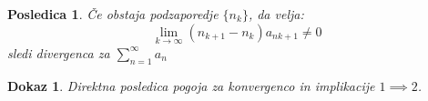 \documentclass{beamer}
\newtheorem{posledica}{Posledica}
\newtheorem{dokaz}{Dokaz}
\begin{document}
\begin{frame}
    \begin{posledica}
        Če obstaja podzaporedje $\{n_k\}$, da velja:
        \[
            \lim_{k \to \infty} (n_{k+1} - n_k)a_{n{k+1}} \neq 0 
        \] 
        sledi divergenca za $\sum_{n = 1}^{\infty}{a_n}$
    \end{posledica}

    \vspace{0.45cm}
    \pause
    \begin{dokaz}
        Direktna posledica pogoja za konvergenco in implikacije $1 \implies 2$.
    \end{dokaz}

    
\end{frame}

\end{document}

